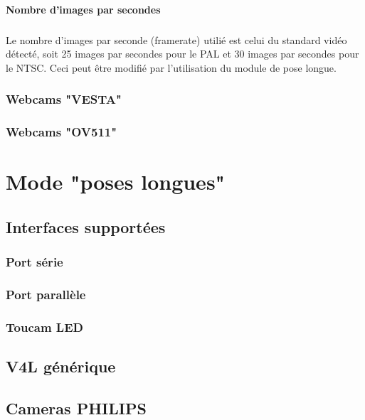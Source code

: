\documentclass[11pt,a4paper]{book}
\begin{document}
\subsubsection{Nombre d'images par secondes}

\paragraph*{}
Le nombre d'images par seconde (framerate) utili\'e est celui du standard vid\'eo d\'etect\'e,
soit 25 images par secondes pour le PAL et 30 images par secondes pour le NTSC. Ceci peut \^etre
modifi\'e par l'utilisation du module de pose longue.  

\subsection{Webcams "VESTA"}

\subsection{Webcams "OV511"}

\chapter{Mode "poses longues"}

\section{Interfaces support\'ees}

\subsection{Port s\'erie}

\subsection{Port parall\`ele}

\subsection{Toucam LED}

\section{V4L g\'en\'erique}

\section{Cameras PHILIPS}
\end{document}
